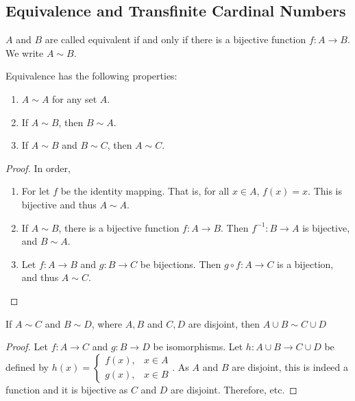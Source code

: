 \documentclass[crop=false,class=article,oneside]{standalone}
\begin{document}
        \subsection{Equivalence and Transfinite Cardinal Numbers}
            \begin{definition}
            $A$ and $B$ are called equivalent if and only if there is a bijective function $f:A\rightarrow B$. We write $A\sim B$.
            \end{definition}
            \begin{theorem}
            Equivalence has the following properties:
            \begin{enumerate}
            \item $A\sim A$ for any set $A$.
            \item If $A\sim B$, then $B\sim A$.
            \item If $A\sim B$ and $B\sim C$, then $A\sim C$.
            \end{enumerate}
            \end{theorem}
            \begin{proof}
            In order,
            \begin{enumerate}
            \item For let $f$ be the identity mapping. That is, for all $x\in A$, $f(x) = x$. This is bijective and thus $A\sim A$.
            \item If $A\sim B$, there is a bijective function $f:A\rightarrow B$. Then $f^{-1}:B\rightarrow A$ is bijective, and $B\sim A$.
            \item Let $f:A\rightarrow B$ and $g:B\rightarrow C$ be bijections. Then $g\circ f:A\rightarrow C$ is a bijection, and thus $A\sim C$.
            \end{enumerate}
            \end{proof}
            \begin{theorem}
            If $A\sim C$ and $B\sim D$, where $A,B$ and $C,D$ are disjoint, then $A\cup B \sim C\cup D$
            \end{theorem}
            \begin{proof}
            Let $f:A\rightarrow C$ and $g:B\rightarrow D$ be isomorphisms. Let $h:A\cup B \rightarrow C\cup D$ be defined by $h(x) = \begin{cases} f(x), & x\in A\\ g(x), & x\in B\end{cases}$. As $A$ and $B$ are disjoint, this is indeed a function and it is bijective as $C$ and $D$ are disjoint. Therefore, etc.
            \end{proof}
\end{document}

